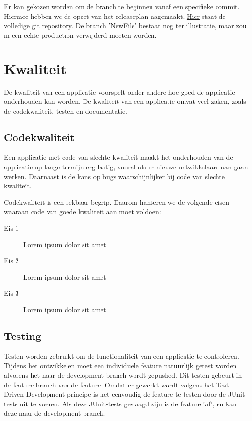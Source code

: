 \documentclass[12pt]{article}
\begin{document}
Er kan gekozen worden om de branch te beginnen vanaf een specifieke commit. Hiermee hebben we de opzet van het releaseplan nagemaakt.
\href{https://github.com/kndschilders/ReleasePlanGitTest}{Hier}
staat de volledige git repository. De branch 'NewFile' bestaat nog ter illustratie, maar zou in een echte production verwijderd moeten worden.

\pagebreak
\section{Kwaliteit}
De kwaliteit van een applicatie voorspelt onder andere hoe goed de applicatie onderhouden kan worden. De kwaliteit van een applicatie omvat veel zaken, zoals de codekwaliteit, testen en documentatie.

\subsection{Codekwaliteit}
Een applicatie met code van slechte kwaliteit maakt het onderhouden van de applicatie op lange termijn erg lastig, vooral als er nieuwe ontwikkelaars aan gaan werken. Daarnaast is de kans op bugs waarschijnlijker bij code van slechte kwaliteit.

Codekwaliteit is een rekbaar begrip. Daarom hanteren we de volgende eisen waaraan code van goede kwaliteit aan moet voldoen:

\begin{description}
	\item[Eis 1] Lorem ipsum dolor sit amet
	\item[Eis 2] Lorem ipsum dolor sit amet
	\item[Eis 3] Lorem ipsum dolor sit amet
\end{description}

\subsection{Testing}
Testen worden gebruikt om de functionaliteit van een applicatie te controleren. Tijdens het ontwikkelen moet een individuele feature natuurlijk getest worden alvorens het naar de development-branch wordt gepushed. Dit testen gebeurt in de feature-branch van de feature. Omdat er gewerkt wordt volgens het Test-Driven Development principe is het eenvoudig de feature te testen door de JUnit-tests uit te voeren. Als deze JUnit-tests geslaagd zijn is de feature 'af', en kan deze naar de development-branch.
\end{document}

